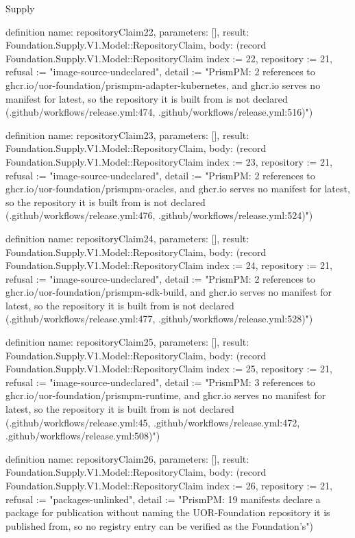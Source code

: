 \begin{lexlean}{Supply}
\begin{semanticmodule}
definition{
  name: repositoryClaim22,
  parameters: [],
  result: Foundation.Supply.V1.Model::RepositoryClaim,
  body: (record Foundation.Supply.V1.Model::RepositoryClaim {index := 22, repository := 21, refusal := "image-source-undeclared", detail := "PrismPM: 2 references to ghcr.io/uor-foundation/prismpm-adapter-kubernetes, and ghcr.io serves no manifest for latest, so the repository it is built from is not declared (.github/workflows/release.yml:474, .github/workflows/release.yml:516)"})
}

definition{
  name: repositoryClaim23,
  parameters: [],
  result: Foundation.Supply.V1.Model::RepositoryClaim,
  body: (record Foundation.Supply.V1.Model::RepositoryClaim {index := 23, repository := 21, refusal := "image-source-undeclared", detail := "PrismPM: 2 references to ghcr.io/uor-foundation/prismpm-oracles, and ghcr.io serves no manifest for latest, so the repository it is built from is not declared (.github/workflows/release.yml:476, .github/workflows/release.yml:524)"})
}

definition{
  name: repositoryClaim24,
  parameters: [],
  result: Foundation.Supply.V1.Model::RepositoryClaim,
  body: (record Foundation.Supply.V1.Model::RepositoryClaim {index := 24, repository := 21, refusal := "image-source-undeclared", detail := "PrismPM: 2 references to ghcr.io/uor-foundation/prismpm-sdk-build, and ghcr.io serves no manifest for latest, so the repository it is built from is not declared (.github/workflows/release.yml:477, .github/workflows/release.yml:528)"})
}

definition{
  name: repositoryClaim25,
  parameters: [],
  result: Foundation.Supply.V1.Model::RepositoryClaim,
  body: (record Foundation.Supply.V1.Model::RepositoryClaim {index := 25, repository := 21, refusal := "image-source-undeclared", detail := "PrismPM: 3 references to ghcr.io/uor-foundation/prismpm-runtime, and ghcr.io serves no manifest for latest, so the repository it is built from is not declared (.github/workflows/release.yml:45, .github/workflows/release.yml:472, .github/workflows/release.yml:508)"})
}

definition{
  name: repositoryClaim26,
  parameters: [],
  result: Foundation.Supply.V1.Model::RepositoryClaim,
  body: (record Foundation.Supply.V1.Model::RepositoryClaim {index := 26, repository := 21, refusal := "packages-unlinked", detail := "PrismPM: 19 manifests declare a package for publication without naming the UOR-Foundation repository it is published from, so no registry entry can be verified as the Foundation's"})
}


\end{semanticmodule}
\end{lexlean}

